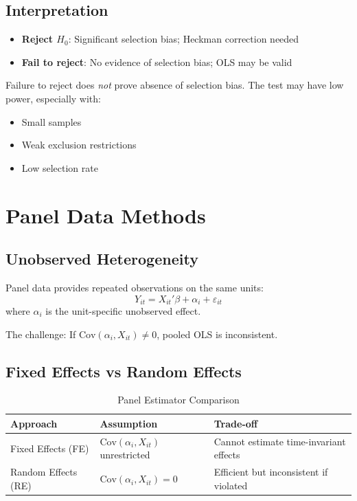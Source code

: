 \subsection{Interpretation}

\begin{itemize}
\item \textbf{Reject $H_0$}: Significant selection bias; Heckman correction needed
\item \textbf{Fail to reject}: No evidence of selection bias; OLS may be valid
\end{itemize}

\begin{warning}
Failure to reject does \textit{not} prove absence of selection bias. The test may have low power, especially with:
\begin{itemize}
\item Small samples
\item Weak exclusion restrictions
\item Low selection rate
\end{itemize}
\end{warning}


\section{Panel Data Methods}

\subsection{Unobserved Heterogeneity}

Panel data provides repeated observations on the same units:
\begin{equation}
Y_{it} = X_{it}'\beta + \alpha_i + \varepsilon_{it}
\end{equation}
where $\alpha_i$ is the unit-specific unobserved effect.

The challenge: If $\text{Cov}(\alpha_i, X_{it}) \neq 0$, pooled OLS is inconsistent.

\subsection{Fixed Effects vs Random Effects}

\begin{table}[h]
\centering
\caption{Panel Estimator Comparison}
\begin{tabular}{lll}
\toprule
Approach & Assumption & Trade-off \\
\midrule
Fixed Effects (FE) & $\text{Cov}(\alpha_i, X_{it})$ unrestricted & Cannot estimate time-invariant effects \\
Random Effects (RE) & $\text{Cov}(\alpha_i, X_{it}) = 0$ & Efficient but inconsistent if violated \\
\bottomrule
\end{tabular}
\end{table}

